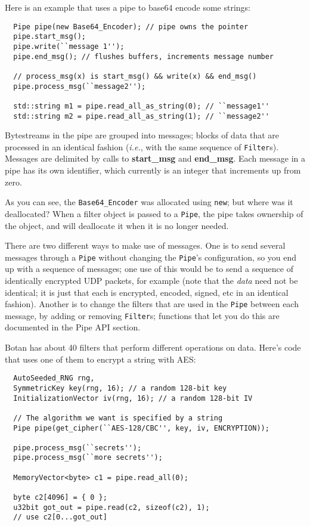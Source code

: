\documentclass{article}
\newcommand{\function}[1]{\textbf{#1}}
\newcommand{\keyword}[1]{\texttt{#1}}
\newcommand{\type}[1]{\texttt{#1}}
\newcommand{\ie}[0]{\emph{i.e.}}
\begin{document}
Here is an example that uses a pipe to base64 encode some strings:

\begin{verbatim}
  Pipe pipe(new Base64_Encoder); // pipe owns the pointer
  pipe.start_msg();
  pipe.write(``message 1'');
  pipe.end_msg(); // flushes buffers, increments message number

  // process_msg(x) is start_msg() && write(x) && end_msg()
  pipe.process_msg(``message2'');

  std::string m1 = pipe.read_all_as_string(0); // ``message1''
  std::string m2 = pipe.read_all_as_string(1); // ``message2''
\end{verbatim}

Bytestreams in the pipe are grouped into messages; blocks of data that
are processed in an identical fashion (\ie, with the same sequence of
\type{Filter}s). Messages are delimited by calls to
\function{start\_msg} and \function{end\_msg}. Each message in a pipe
has its own identifier, which currently is an integer that increments
up from zero.

As you can see, the \type{Base64\_Encoder} was allocated using
\keyword{new}; but where was it deallocated? When a filter object is
passed to a \type{Pipe}, the pipe takes ownership of the object, and
will deallocate it when it is no longer needed.

There are two different ways to make use of messages. One is to send
several messages through a \type{Pipe} without changing the
\type{Pipe}'s configuration, so you end up with a sequence of
messages; one use of this would be to send a sequence of identically
encrypted UDP packets, for example (note that the \emph{data} need not
be identical; it is just that each is encrypted, encoded, signed, etc
in an identical fashion). Another is to change the filters that are
used in the \type{Pipe} between each message, by adding or removing
\type{Filter}s; functions that let you do this are documented in the
Pipe API section.

Botan has about 40 filters that perform different operations on data.
Here's code that uses one of them to encrypt a string with AES:

\begin{verbatim}
  AutoSeeded_RNG rng,
  SymmetricKey key(rng, 16); // a random 128-bit key
  InitializationVector iv(rng, 16); // a random 128-bit IV

  // The algorithm we want is specified by a string
  Pipe pipe(get_cipher(``AES-128/CBC'', key, iv, ENCRYPTION));

  pipe.process_msg(``secrets'');
  pipe.process_msg(``more secrets'');

  MemoryVector<byte> c1 = pipe.read_all(0);

  byte c2[4096] = { 0 };
  u32bit got_out = pipe.read(c2, sizeof(c2), 1);
  // use c2[0...got_out]
\end{verbatim}
\end{document}

